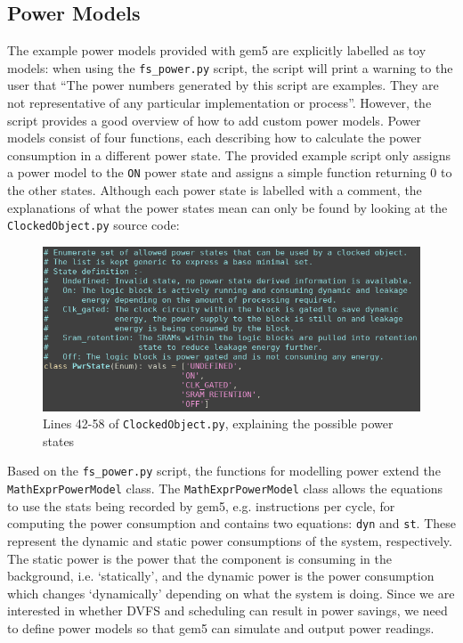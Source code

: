     \subsection{Power Models}\label{subsec:ext-power-mods}
    The example power models provided with gem5 are explicitly labelled as toy
    models: when using the \texttt{fs\_power.py} script, the script will print a
    warning to the user that ``The power numbers generated by this script are 
    examples. They are not representative of any particular implementation or 
    process''. However, the script provides a good overview of how to add custom
    power models. Power models consist of four functions, each describing how
    to calculate the power consumption in a different power state. The provided 
    example script only assigns a power model to the \texttt{ON} power state and
    assigns a simple function returning 0 to the other states. Although each
    power state is labelled with a comment, the explanations of what the power
    states mean can only be found by looking at the \texttt{ClockedObject.py}
    source code:
    \begin{figure}[H]
        \centering
        \includegraphics[width=0.9\linewidth]{screenshots/power-states/details.png}
        \caption{Lines 42-58 of \texttt{ClockedObject.py}, explaining the
                 possible power states}
    \end{figure}
    Based on the \texttt{fs\_power.py} script, the functions for modelling power
    extend the \texttt{MathExprPowerModel} class. The 
    \texttt{MathExprPowerModel} class allows the equations to use the stats 
    being recorded by gem5, e.g. instructions per cycle, for computing the 
    power consumption \cite{bischoff_gem5_2017-1} and contains two equations: 
    \texttt{dyn} and \texttt{st}. These represent the dynamic and static power 
    consumptions of the system, respectively. The static power is the power that
    the component is consuming in the background, i.e. `statically', and the
    dynamic power is the power consumption which changes `dynamically' depending
    on what the system is doing. Since we are interested in whether DVFS and 
    scheduling can result in power savings, we need to define power models so 
    that gem5 can simulate and output power readings.
    
